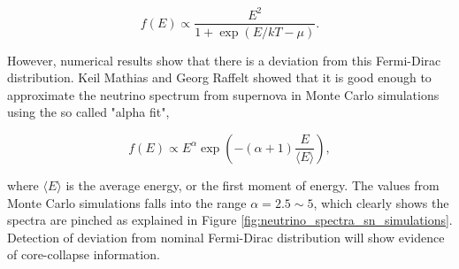 \documentclass[%
 aip,
 jmp,%
 amsmath,amssymb,
 reprint,%
]{revtex4-1}
\begin{document}
\begin{equation}
f(E)\propto \frac{E^2}{1+\exp ( E/kT - \mu )}.
\end{equation}

However, numerical results show that there is a deviation from this Fermi-Dirac distribution.\cite{Totani1998,Keil2003} Keil Mathias and Georg Raffelt showed that it is good enough to approximate the neutrino spectrum from supernova in Monte Carlo simulations using the so called "alpha fit",

\begin{equation}
f(E)\propto E^\alpha \exp\left( -(\alpha+1)\frac{E}{\langle E\rangle} \right),
\end{equation}

where $\langle E\rangle$ is the average energy, or the first moment of energy. The values from Monte Carlo simulations falls into the range $\alpha = 2.5\sim 5$, which clearly shows the spectra are pinched as explained in Figure \ref{fig:neutrino_spectra_sn_simulations}. Detection of deviation from nominal Fermi-Dirac distribution will show evidence of core-collapse information.
\end{document}
